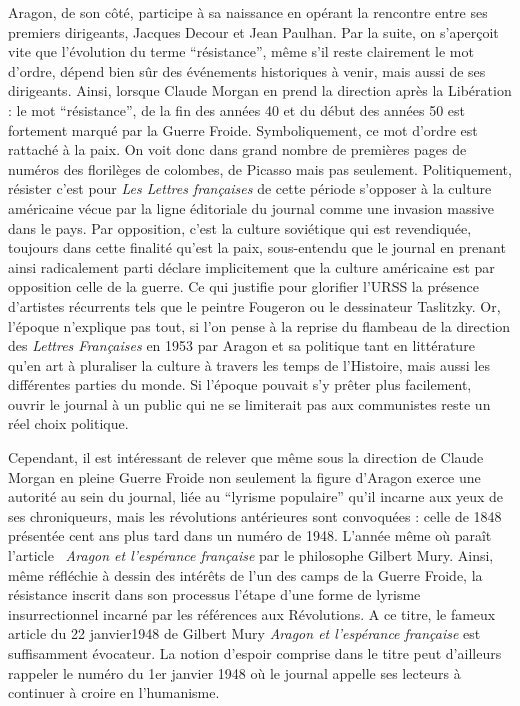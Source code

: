 	Aragon, de son côté, participe à sa naissance en opérant la rencontre entre ses premiers dirigeants, Jacques Decour et Jean Paulhan. Par la suite, on s’aperçoit vite que l’évolution du terme \enquote{résistance}, même s’il reste clairement le mot d’ordre, dépend bien sûr des événements historiques à venir, mais aussi de ses dirigeants. Ainsi, lorsque Claude Morgan en prend la direction après la Libération : le mot \enquote{résistance}, de la fin des années 40 et du début des années 50 est  fortement marqué par la Guerre Froide. Symboliquement, ce mot d’ordre est rattaché à la paix. On voit donc dans grand nombre de premières pages de numéros des florilèges de colombes, de Picasso mais pas seulement. Politiquement, résister c’est pour \emph{Les Lettres françaises} de cette période s’opposer à la culture américaine vécue par la ligne éditoriale du journal comme une invasion massive dans le pays. Par opposition, c’est la culture soviétique qui est revendiquée, toujours dans cette finalité qu’est la paix, sous-entendu que le journal en prenant ainsi radicalement parti déclare implicitement que la culture américaine est par opposition celle de la guerre. Ce qui justifie pour glorifier l’URSS la présence d’artistes récurrents tels que le peintre Fougeron ou le dessinateur Taslitzky. Or, l’époque n’explique pas tout, si l’on pense à la reprise du flambeau de la direction des \emph{Lettres Françaises} en 1953 par Aragon et sa politique tant en littérature qu’en art à pluraliser la culture à travers les temps de l’Histoire, mais aussi les différentes parties du monde. Si l’époque pouvait s’y prêter plus facilement, ouvrir le journal à un public qui ne se limiterait pas aux communistes reste un réel choix politique. 


Cependant, il est intéressant de relever que même sous la direction de Claude Morgan en pleine Guerre Froide non seulement la figure d’Aragon exerce une autorité au sein du journal, liée au \enquote{lyrisme populaire} qu’il incarne aux yeux de ses chroniqueurs, mais les révolutions antérieures sont convoquées : celle de 1848 présentée  cent ans plus tard dans un numéro de 1948. L’année même où paraît l’article  \emph{Aragon et l’espérance française} par le philosophe Gilbert Mury. Ainsi, même réfléchie à dessin des intérêts de l’un des camps de la Guerre Froide, la résistance inscrit dans son processus l’étape d’une forme de lyrisme insurrectionnel incarné par les références aux Révolutions. A ce titre, le fameux article du 22 janvier1948 de Gilbert Mury \emph{Aragon et l’espérance française} est suffisamment évocateur. La notion d’espoir comprise dans le titre peut d’ailleurs rappeler le numéro du 1er janvier 1948 où le journal appelle ses lecteurs à continuer à croire en l’humanisme. 


